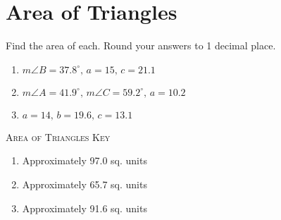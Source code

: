 \chapter{Area of Triangles}

Find the area of each. Round your answers to 1 decimal place.

\begin{enumerate}
	\item $m\angle B = 37.8^\circ, \, a = 15, \, c = 21.1$
    \item $m\angle A = 41.9^\circ, \, m\angle C = 59.2^\circ, \, a = 10.2$
    \item $a = 14, \, b = 19.6, \, c = 13.1$
\end{enumerate}

\newpage

\textsc{Area of Triangles Key}

\begin{enumerate}
	\item Approximately 97.0 sq. units
	\item Approximately 65.7 sq. units
	\item Approximately 91.6 sq. units
\end{enumerate}